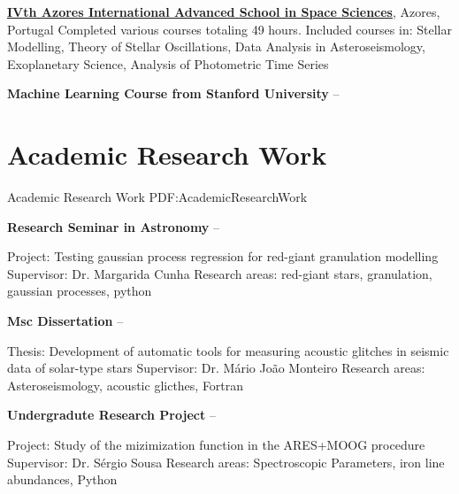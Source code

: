 \documentclass[letterpaper,10pt,oneside]{article}
\begin{document}
\begin{body}
\href{http://www.iastro.pt/research/conferences/faial2016/}
{\textbf{IVth Azores International Advanced School in Space Sciences}},
Azores, Portugal
\hfill
{}
\GapNoBreak
\BulletItem
Completed various courses totaling 49 hours.
\BulletItem
Included courses in: Stellar Modelling, Theory of Stellar Oscillations, Data Analysis in Asteroseismology, Exoplanetary Science, Analysis of Photometric Time Series

\BigGap
{\textbf{Machine Learning Course from Stanford University}}
\hfill
{} --



\section
{Academic Research Work}
{Academic Research Work}
{PDF:AcademicResearchWork}

{\textbf{Research Seminar in Astronomy}}
\hfill
{} --
\begin{detail}
\SubBulletItem
Project: Testing gaussian process regression for red-giant granulation modelling
\SubBulletItem
Supervisor:
Dr. Margarida Cunha
\SubBulletItem
Research areas: red-giant stars, granulation, gaussian processes, python
\end{detail}

{\textbf{Msc Dissertation}}
\hfill
{} --
\begin{detail}
\SubBulletItem
Thesis: Development of automatic tools for measuring acoustic glitches in seismic data of solar-type stars
\SubBulletItem
Supervisor:
Dr. Mário João Monteiro
\SubBulletItem
Research areas: Asteroseismology, acoustic glicthes, Fortran
\end{detail}

\GapNoBreak
{\textbf{Undergradute Research Project}}
\hfill
{} --
\begin{detail}
\SubBulletItem
Project:
Study of the mizimization function in the ARES+MOOG procedure
\SubBulletItem
Supervisor:
Dr. Sérgio Sousa
\SubBulletItem
Research areas: Spectroscopic Parameters, iron line abundances, Python
\end{detail}




\end{body}
\end{document}
